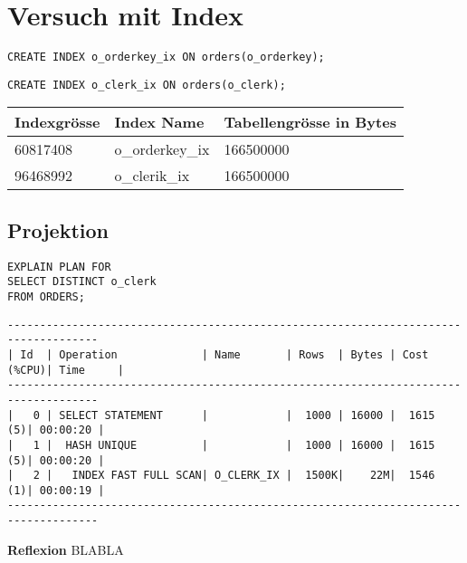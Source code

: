 \documentclass[10pt]{article}
\begin{document}
\section{Versuch mit Index}
\begin{lstlisting}[style=sql]
CREATE INDEX o_orderkey_ix ON orders(o_orderkey);
\end{lstlisting}
\begin{lstlisting}[style=sql]
CREATE INDEX o_clerk_ix ON orders(o_clerk);
\end{lstlisting}
{\normalsize
\begin{tabular}{|l|l|l|}
\hline
 Indexgrösse & Index Name & Tabellengrösse in Bytes \\
\hline
\hline
60817408 & o\_orderkey\_ix & 166500000 \\
\hline
96468992	 & o\_clerik\_ix & 166500000 \\
\hline
\end{tabular}
}

\subsection{Projektion}
\begin{lstlisting}[style=sql]
EXPLAIN PLAN FOR
SELECT DISTINCT o_clerk
FROM ORDERS;
\end{lstlisting}
\begin{lstlisting}[style=queryexecutionplan]
------------------------------------------------------------------------------------
| Id  | Operation             | Name       | Rows  | Bytes | Cost (%CPU)| Time     |
------------------------------------------------------------------------------------
|   0 | SELECT STATEMENT      |            |  1000 | 16000 |  1615   (5)| 00:00:20 |
|   1 |  HASH UNIQUE          |            |  1000 | 16000 |  1615   (5)| 00:00:20 |
|   2 |   INDEX FAST FULL SCAN| O_CLERK_IX |  1500K|    22M|  1546   (1)| 00:00:19 |
------------------------------------------------------------------------------------
\end{lstlisting}
\textbf{Reflexion} \newline
BLABLA
\end{document}
